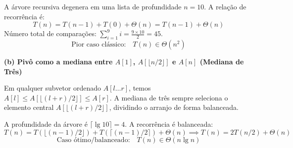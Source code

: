 \documentclass[11pt,a4paper]{article}
\newcommand{\res}[1]{\[\boxed{#1}\]}
\newcommand{\topico}[1]{\par\medskip\textbf{\color{azul}#1}\par}
\begin{document}
A árvore recursiva degenera em uma lista de profundidade $n = 10$. A relação de recorrência é:
\[
T(n) = T(n-1) + T(0) + \Theta(n) = T(n-1) + \Theta(n)
\]
Número total de comparações: $\sum_{i=1}^{9} i = \frac{9 \times 10}{2} = 45$.
\res{\text{Pior caso clássico:} \quad T(n) \in \Theta(n^2)}

\topico{(b) Pivô como a mediana entre $A[1]$, $A[\lfloor n/2 \rfloor]$ e $A[n]$ (Mediana de Três)}
Em qualquer subvetor ordenado $A[l \dots r]$, temos $A[l] \le A[\lfloor (l+r)/2 \rfloor] \le A[r]$. A mediana de três sempre seleciona o elemento central $A[\lfloor (l+r)/2 \rfloor]$, dividindo o arranjo de forma balanceada.

\begin{center}
\end{center}

A profundidade da árvore é $\lceil \lg 10 \rceil = 4$. A recorrência é balanceada:
\[
T(n) = T(\lfloor (n-1)/2 \rfloor) + T(\lceil (n-1)/2 \rceil) + \Theta(n) \implies T(n) = 2T(n/2) + \Theta(n)
\]
\res{\text{Caso ótimo/balanceado:} \quad T(n) \in \Theta(n \lg n)}
\end{document}
